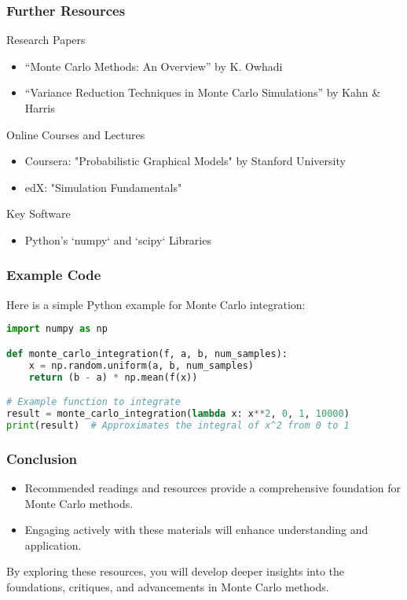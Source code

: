 \documentclass[aspectratio=169]{beamer}
\begin{document}
\begin{frame}[fragile]
  \frametitle{Further Resources}
  
  \begin{block}{Research Papers}
      \begin{itemize}
          \item “Monte Carlo Methods: An Overview” by K. Owhadi
          \item “Variance Reduction Techniques in Monte Carlo Simulations” by Kahn \& Harris
      \end{itemize}
  \end{block}
  
  \begin{block}{Online Courses and Lectures}
      \begin{itemize}
          \item Coursera: "Probabilistic Graphical Models" by Stanford University
          \item edX: "Simulation Fundamentals"
      \end{itemize}
  \end{block}
  
  \begin{block}{Key Software}
      \begin{itemize}
          \item Python's `numpy` and `scipy` Libraries
      \end{itemize}
  \end{block}
\end{frame}

\begin{frame}[fragile]
  \frametitle{Example Code}
  
  Here is a simple Python example for Monte Carlo integration:
  
  \begin{lstlisting}[language=Python]
import numpy as np

def monte_carlo_integration(f, a, b, num_samples):
    x = np.random.uniform(a, b, num_samples)
    return (b - a) * np.mean(f(x))

# Example function to integrate
result = monte_carlo_integration(lambda x: x**2, 0, 1, 10000)
print(result)  # Approximates the integral of x^2 from 0 to 1
  \end{lstlisting}
\end{frame}

\begin{frame}[fragile]
  \frametitle{Conclusion}
  
  \begin{itemize}
      \item Recommended readings and resources provide a comprehensive foundation for Monte Carlo methods.
      \item Engaging actively with these materials will enhance understanding and application.
  \end{itemize}
  
  By exploring these resources, you will develop deeper insights into the foundations, critiques, and advancements in Monte Carlo methods.
\end{frame}
\end{document}
